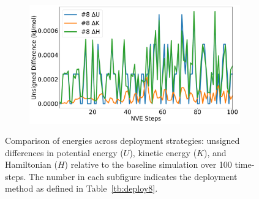 \begin{figure}[htbp]
\begin{subfigure}{0.48\textwidth}
\end{subfigure}
\begin{subfigure}{0.48\textwidth}
\includegraphics[width=\linewidth]{figs/div8.pdf}
\end{subfigure}
\caption{Comparison of energies across deployment strategies:
unsigned differences in potential energy ($U$), kinetic energy ($K$), and
Hamiltonian ($H$) relative to the baseline simulation over 100 time-steps.
The number in each subfigure indicates the deployment method
as defined in Table~\ref{tb:deploy8}.}\label{fig:convergence}
\end{figure}
